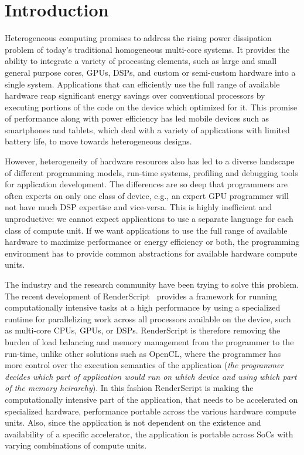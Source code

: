 \section{Introduction}

Heterogeneous computing promises to address the rising power dissipation problem
of today's traditional homogeneous multi-core
systems. It provides the ability to integrate a variety of processing elements,
such as large and small general purpose cores, GPUs, DSPs, and custom or
semi-custom hardware into a single system. Applications that can efficiently use
the full range of available hardware reap significant energy
savings over conventional processors by executing portions of the code on the
device which optimized for it. This promise of performance along with power efficiency
has led mobile devices such as smartphones
and tablets, which deal with a variety of applications with limited battery
life, to move towards heterogeneous designs.

However, heterogeneity of hardware resources also has led to a diverse landscape
of different programming models, run-time systems, profiling and debugging tools
for application development. The differences are so deep that programmers are
often experts on only one class of device, e.g., an expert GPU programmer will
not have much DSP expertise and vice-versa. This is highly inefficient and
unproductive: we cannot expect applications to use a separate language for each
class of compute unit. If we want applications to use the full range of
available hardware to maximize performance or energy efficiency or both, the
programming environment has to provide common abstractions for available
hardware compute units.

The industry and the research community have been trying to solve this problem.
The recent development of RenderScript~\cite{wiki:RenderScript, RenderScript}
provides a framework for running computationally intensive tasks at a high
performance by using a specialized runtime for parallelizing work across all
processors available on the device, such as multi-core CPUs, GPUs, or DSPs.
RenderScript is therefore removing the burden of load balancing and memory
management from the programmer to the run-time, unlike other solutions such as
OpenCL, where the programmer has more control over the execution semantics of
the application ({\em the programmer decides which part of application would run
on which device and using which part of the memory heirarchy}).  In this fashion
RenderScript is making the computationally intensive part of the application,
that needs to be accelerated on specialized hardware, performance portable
across the various hardware compute units. Also, since the application is not
dependent on the existence and availability of a specific accelerator, the
application is portable across SoCs with varying combinations of compute units.

